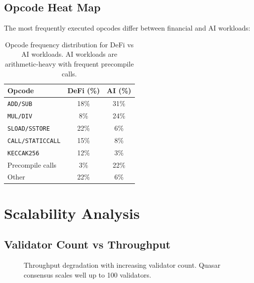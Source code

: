\documentclass[11pt,letterpaper]{article}
\begin{document}
\subsection{Opcode Heat Map}

The most frequently executed opcodes differ between financial and AI workloads:

\begin{table}[t]
\centering
\begin{tabular}{lcc}
\toprule
\textbf{Opcode} & \textbf{DeFi (\%)} & \textbf{AI (\%)} \\
\midrule
\texttt{ADD/SUB} & 18\% & 31\% \\
\texttt{MUL/DIV} & 8\% & 24\% \\
\texttt{SLOAD/SSTORE} & 22\% & 6\% \\
\texttt{CALL/STATICCALL} & 15\% & 8\% \\
\texttt{KECCAK256} & 12\% & 3\% \\
Precompile calls & 3\% & 22\% \\
Other & 22\% & 6\% \\
\bottomrule
\end{tabular}
\caption{Opcode frequency distribution for DeFi vs AI workloads. AI workloads are arithmetic-heavy with frequent precompile calls.}
\label{tab:opcodes}
\end{table}

\section{Scalability Analysis}

\subsection{Validator Count vs Throughput}

\begin{figure}[t]
\centering
{}
\caption{Throughput degradation with increasing validator count. Quasar consensus scales well up to 100 validators.}
\label{fig:scaling}
\end{figure}
\end{document}
